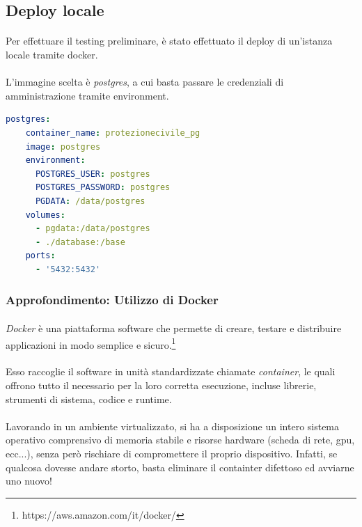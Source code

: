 \documentclass[11pt,a4paper,english]{article}
\begin{document}
\subsection{Deploy locale}

\paragraph{} Per effettuare il testing preliminare, è stato effettuato il deploy di un'istanza locale tramite docker. 

\paragraph{} L'immagine scelta è \emph{postgres}, a cui basta passare le credenziali di amministrazione tramite environment. 

\begin{lstlisting}[language=YAML, caption=Configurazione di docker compose per postgres]
postgres:
    container_name: protezionecivile_pg
    image: postgres
    environment:
      POSTGRES_USER: postgres
      POSTGRES_PASSWORD: postgres
      PGDATA: /data/postgres
    volumes:
      - pgdata:/data/postgres
      - ./database:/base
    ports:
      - '5432:5432'
\end{lstlisting}


\subsubsection{Approfondimento: Utilizzo di Docker}

\paragraph{} \emph{Docker} è una piattaforma software che permette di creare, testare e distribuire applicazioni in modo semplice e sicuro.\footnote{https://aws.amazon.com/it/docker/} 

\paragraph{} Esso raccoglie il software in unità standardizzate chiamate \emph{container}, le quali offrono tutto il necessario per la loro corretta esecuzione, incluse librerie, strumenti di sistema, codice e runtime. 

\paragraph{} Lavorando in un ambiente virtualizzato, si ha a disposizione un intero sistema operativo comprensivo di memoria stabile e risorse hardware (scheda di rete, gpu, ecc...), senza però rischiare di compromettere il proprio dispositivo. Infatti, se qualcosa dovesse andare storto, basta eliminare il containter difettoso ed avviarne uno nuovo!
\end{document}
